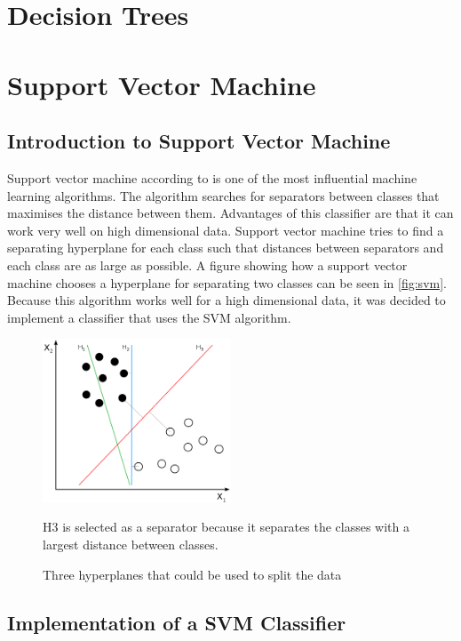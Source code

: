 \section{Decision Trees}

\fi

\section{Support Vector Machine}

\subsection{Introduction to Support Vector Machine}

Support vector machine according to  \cite{boser1992training} is one of the most influential machine learning algorithms. The algorithm searches for separators between classes that maximises the distance between them. Advantages of this classifier are that it can work very well on high dimensional data. Support vector machine tries to find a separating hyperplane for each class such that distances between separators and each class are as large as possible. A figure showing how a support vector machine chooses a hyperplane for separating two classes can be seen in \autoref{fig:svm}. Because this algorithm works well for a high dimensional data, it was decided to implement a classifier that uses the SVM algorithm.

\begin{figure}[h]
\centering
\includegraphics[width=0.5\textwidth]{Figures/svm.PNG}
\caption{Three hyperplanes  that could be used to split the data  }
\medskip
H3 is selected as a separator because it separates the classes with a largest distance between classes.
\citep{wikipedia_svm}
\label{fig:svm}
\end{figure}


\subsection{Implementation of a SVM Classifier}

